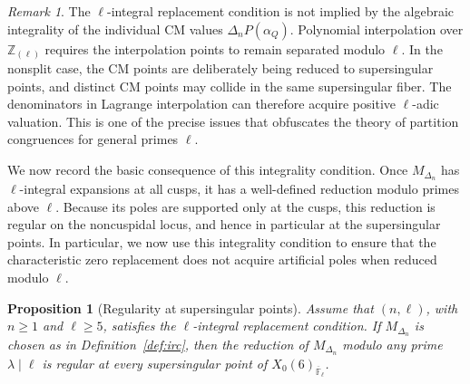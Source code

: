 \documentclass[12pt]{amsart}
\newtheorem{proposition}[theorem]{Proposition}
\theoremstyle{definition}
\theoremstyle{remark}
\newtheorem{remark}{Remark}
\newcommand{\Z}{\mathbb{Z}}
\begin{document}
\begin{remark}
The $\ell$-integral replacement condition is not implied by the algebraic integrality of the
individual CM values $\Delta_nP(\alpha_Q)$. Polynomial interpolation over $\Z_{(\ell)}$
requires the interpolation points to remain separated modulo $\ell$. In the nonsplit case,
the CM points are deliberately being reduced to supersingular points, and distinct CM points
may collide in the same supersingular fiber. The denominators in Lagrange interpolation can
therefore acquire positive $\ell$-adic valuation. This is one of the precise issues that obfuscates the theory of partition congruences for general primes $\ell.$
\end{remark}

We now record the basic consequence of this integrality condition.  Once
$M_{\Delta_n}$ has $\ell$-integral expansions at all cusps, it has a
well-defined reduction modulo primes above $\ell$.  Because its poles are
supported only at the cusps, this reduction is regular on the noncuspidal
locus, and hence in particular at the supersingular points. In particular, we now use this integrality condition to ensure that the characteristic
zero replacement does not acquire artificial poles when reduced modulo
$\ell$.

\begin{proposition}[Regularity at supersingular points]
\label{prop:reg}
Assume that $(n,\ell)$, with $n\geq 1$ and $\ell\geq 5$, satisfies the
$\ell$-integral replacement condition.  If $M_{\Delta_n}$ is chosen as
in Definition~\ref{def:irc}, then the reduction of
$M_{\Delta_n}$ modulo any prime $\lambda\mid \ell$ is regular at every
supersingular point of $X_0(6)_{\overline{\mathbb{F}}_\ell}$.
\end{proposition}
\end{document}
